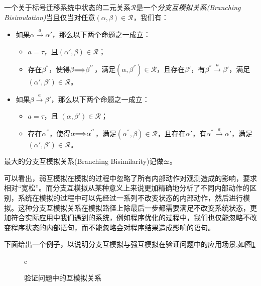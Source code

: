 \begin{defn}\label{def:bra-bis}
一个关于标号迁移系统中状态的二元关系$\mathcal{R}$是一个\emph{分支互模拟关系(Branching Bisimulation)}当且仅当对任意$(\alpha,\beta)\in \mathcal{R}$，我们有：
\begin{itemize}
    \item 如果$\alpha\stackrel{a}{\longrightarrow}\alpha'$，那么以下两个命题之一成立：
    \begin{itemize}
        \item $a=\tau$，且$(\alpha',\beta)\in\mathcal{R}$；
        \item 存在$\beta^{''}$，使得$\beta{\stackrel{}{\Longrightarrow}}\beta^{''}$，满足$(\alpha,\beta^{''})\in\mathcal{R}$，且存在$\beta'$，有$\beta^{''}\stackrel{a}{\longrightarrow}\beta'$，满足$(\alpha',\beta')\in\mathcal{R}$。
    \end{itemize}
    \item 如果$\beta\stackrel{a}{\longrightarrow}\beta'$，那么以下两个命题之一成立：
    \begin{itemize}
        \item $a=\tau$，且 $(\alpha,\beta')\in\mathcal{R}$；
        \item 存在$\alpha^{''}$，使得$\alpha{\stackrel{}{\Longrightarrow}}\alpha^{''}$，满足$(\alpha^{''},\beta)\in\mathcal{R}$，且存在$\alpha'$，有$\alpha^{''}\stackrel{a}{\longrightarrow}\alpha'$，满足$(\alpha',\beta')\in\mathcal{R}$。
    \end{itemize}
\end{itemize}
最大的分支互模拟关系(Branching Bisimilarity)记做$\simeq$。
\end{defn}

可以看出，弱互模拟在模拟的过程中忽略了所有内部动作对观测造成的影响，要求相对``宽松''。而分支互模拟从某种意义上来说更加精确地分析了不同内部动作的区别，系统在模拟的过程中可以先经过一系列不改变状态的内部动作，然后进行模拟。这种分支互模拟关系在模拟路径上除最后一步都需要满足不改变系统状态，更加符合实际应用中我们遇到的系统，例如程序优化的过程中，我们也仅能忽略不改变程序状态的内部语句，而不能忽略会对程序结果造成影响的语句。

下面给出一个例子，以说明分支互模拟与强互模拟在验证问题中的应用场景,如图\ref{fig:bis-verif}

\begin{figure}[htbp]
\begin{center}
\begin{tabular}{c}
\end{tabular}
\end{center}
\caption{验证问题中的互模拟关系}
\label{fig:bis-verif}
\end{figure}

